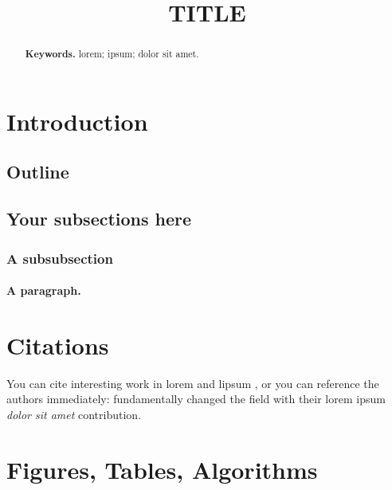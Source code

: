 \documentclass[12pt]{article}
\title{TITLE}
\author{}
\date{}
\begin{document}
\maketitle
\begin{abstract}%

\lipsum[1]

\smallskip
\noindent \textbf{Keywords.} lorem; ipsum; dolor sit amet.

\end{abstract}%

\section{Introduction}

\lipsum[1]

\subsection{Outline}

\lipsum[2]

\subsection{Your subsections here}

\lipsum[3-5]

\subsubsection{A subsubsection}

\lipsum[6]

\paragraph{A paragraph.} \lipsum[7]

\section{Citations}

You can cite interesting work in lorem \citep{doe1999lorem} and lipsum \citep{doe2001lipsum}, or you can reference the authors immediately: \cite{madani2009loremipsum} fundamentally changed the field with their lorem ipsum {\em dolor sit amet} contribution.

\section{Figures, Tables, Algorithms}
\end{document}
